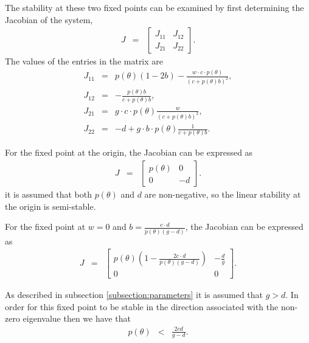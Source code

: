 \documentclass[review,authoryear]{elsarticle}
\begin{document}
The stability at these two fixed points can be examined by first
determining the Jacobian of the system,
\begin{eqnarray*}
  J & = & \left[
          \begin{array}{rr}
            J_{11} & J_{12} \\
            J_{21} & J_{22}
          \end{array}
          \right].
\end{eqnarray*}
The values of the entries in the matrix are
\begin{eqnarray*}
  J_{11} & = & p(\theta)\left(1-2b\right) -
               \frac{w\cdot c \cdot p(\theta)}{\left( c + p(\theta)b \right)^2}, \\
  J_{12} & = & -\frac{p(\theta)b}{c+p(\theta)b}, \\
  J_{21} & = & g\cdot c \cdot  p(\theta) \frac{w}{\left(c+p(\theta)b\right)^2}, \\
  J_{22} & = & -d + g\cdot b \cdot  p(\theta) \frac{1}{c+p(\theta)b}.
\end{eqnarray*}

For the fixed point at the origin, the Jacobian can be expressed as 
\begin{eqnarray*}
  J & = & \left[
          \begin{array}{rr}
            p(\theta) & 0 \\
            0 & -d
          \end{array}
          \right].
\end{eqnarray*}
it is assumed that both $p(\theta)$ and $d$ are non-negative, so the
linear stability at the origin is semi-stable.

For the fixed point at $w=0$ and
$b=\frac{c\cdot d}{p(\theta)\left(g - d\right)}$, the Jacobian can be
expressed as 
\begin{eqnarray*}
  J & = & \left[
          \begin{array}{cc}
            p(\theta)\left( 1 -
            \frac{2c\cdot d}{p(\theta)(g-d)} \right) & -\frac{d}{g} \\
            0 & 0
          \end{array}
          \right].
\end{eqnarray*}

As described in subsection \ref{subsection:parameters} it is assumed
that $g>d$. In order for this fixed point to be stable in the
direction associated with the non-zero eigenvalue then we have that
\begin{eqnarray*}
  p(\theta) & < & \frac{2cd}{g-d}.
\end{eqnarray*}
\end{document}
